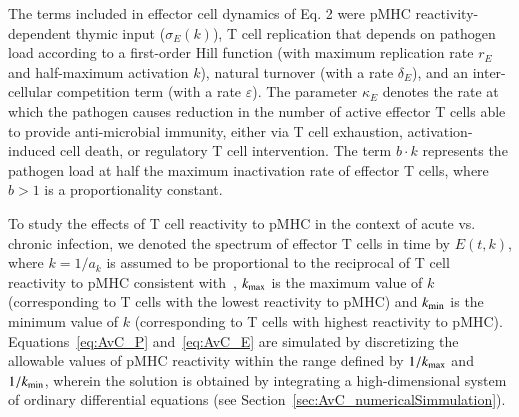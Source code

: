 The terms included in effector cell dynamics of Eq. 2 were pMHC reactivity-dependent thymic input ($\sigma_E(k)$), T cell replication that depends on pathogen load according to a first-order Hill function (with maximum replication rate $r_E$ and half-maximum activation $k$), natural turnover (with a rate $\delta_E$), and an inter-cellular competition term (with a rate $\varepsilon$). The parameter $\kappa_E$ denotes the rate at which the pathogen causes reduction in the number of active effector T cells able to provide anti-microbial immunity, either via T cell exhaustion, activation-induced cell death, or regulatory T cell intervention. The term $b \cdot k$ represents the pathogen load at half the maximum inactivation rate of effector T cells, where $b>1$ is a proportionality constant.

To study the effects of T cell reactivity to pMHC in the context of acute vs. chronic infection, we denoted the spectrum of effector T cells in time by $E(t,k)$, where $k=1/a_k$ is assumed to be proportional to the reciprocal of T cell reactivity to pMHC consistent with~\cite{standifer2009changes}, $k_{\textrm{max}}$ is the maximum value of $k$ (corresponding to T cells with the lowest reactivity to pMHC) and $k_{\textrm{min}}$ is the minimum value of $k$ (corresponding to T cells with highest reactivity to pMHC). Equations~\eqref{eq:AvC_P} and~\eqref{eq:AvC_E} are simulated by discretizing the allowable values of pMHC reactivity within the range defined by $1/k_{\textrm{max}}$ and $1/k_{\textrm{min}}$, wherein the solution is obtained by integrating a high-dimensional system of ordinary differential equations (see Section~\ref{sec:AvC_numericalSimmulation}).

